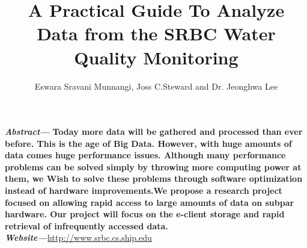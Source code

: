 \documentclass[a4paper]{article}
\begin{document}
\title{A Practical Guide To Analyze Data from the SRBC Water Quality Monitoring}
\author{Eswara Sravani Munnangi, Joss C.Steward and Dr. Jeonghwa Lee}
\date{\vspace{-2ex}}
\maketitle
\begin{minipage}[t]{0.45\textwidth}
{\normalsize\textit{\textbf{ Abstract---}}}{
  \normalsize 
  \textbf{Today more data will be gathered and processed than ever before. This is the age of Big Data. However, with huge amounts of data comes huge performance issues. Although many performance problems can be solved simply by throwing more computing power at them, we Wish to solve these problems through software optimization instead of hardware improvements.We propose a research project focused on allowing rapid access to large amounts of data on subpar hardware. Our project will focus on the e-client storage and rapid retrieval of infrequently accessed data.}}
{\normalsize \textit{\textbf{\\Website---}}}\url{http://www.srbc.cs.ship.edu}

\end{minipage}
\end{document}
